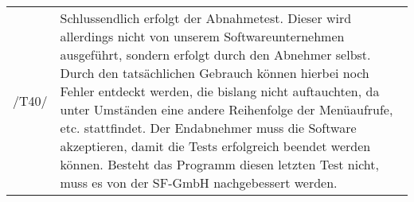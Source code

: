 \begin{tabular}{p{1.5cm}p{14.5cm}}
 /T40/	& Schlussendlich erfolgt der Abnahmetest. Dieser wird allerdings nicht von unserem Softwareunternehmen ausgeführt, sondern erfolgt durch den Abnehmer selbst. Durch den tatsächlichen Gebrauch können hierbei noch Fehler entdeckt werden, die bislang nicht auftauchten, da unter Umständen eine andere Reihenfolge der Menüaufrufe, etc. stattfindet. Der Endabnehmer muss die Software akzeptieren, damit die Tests erfolgreich beendet werden können. Besteht das Programm diesen letzten Test nicht, muss es von der SF-GmbH  nachgebessert werden. \\[0.25cm]	 
\end{tabular}